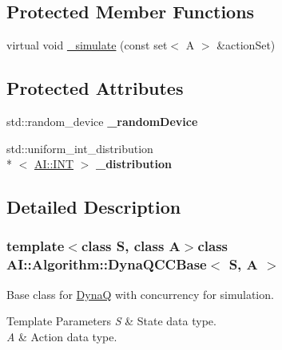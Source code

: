 \subsection*{Protected Member Functions}
\begin{DoxyCompactItemize}
\item 
virtual void \hyperlink{classAI_1_1Algorithm_1_1DynaQCCBase_adc1bb07bb9025dc0c2963ded741b43a2}{\+\_\+simulate} (const set$<$ A $>$ \&action\+Set)
\end{DoxyCompactItemize}
\subsection*{Protected Attributes}
\begin{DoxyCompactItemize}
\item 
\hypertarget{classAI_1_1Algorithm_1_1DynaQCCBase_a0826c4c68c5d7b11bcb560d1b23b3252}{std\+::random\+\_\+device {\bfseries \+\_\+random\+Device}}\label{classAI_1_1Algorithm_1_1DynaQCCBase_a0826c4c68c5d7b11bcb560d1b23b3252}

\item 
\hypertarget{classAI_1_1Algorithm_1_1DynaQCCBase_ab2859ca39decdd0a8921e0ac500ed6f3}{std\+::uniform\+\_\+int\+\_\+distribution\\*
$<$ \hyperlink{namespaceAI_ac74584e573f07aa4194b461b1ba7be64}{A\+I\+::\+I\+N\+T} $>$ {\bfseries \+\_\+distribution}}\label{classAI_1_1Algorithm_1_1DynaQCCBase_ab2859ca39decdd0a8921e0ac500ed6f3}

\end{DoxyCompactItemize}


\subsection{Detailed Description}
\subsubsection*{template$<$class S, class A$>$class A\+I\+::\+Algorithm\+::\+Dyna\+Q\+C\+C\+Base$<$ S, A $>$}

Base class for \hyperlink{classAI_1_1Algorithm_1_1DynaQ}{Dyna\+Q} with concurrency for simulation. 


\begin{DoxyTemplParams}{Template Parameters}
{\em S} & State data type. \\
\hline
{\em A} & Action data type. \\
\hline
\end{DoxyTemplParams}


